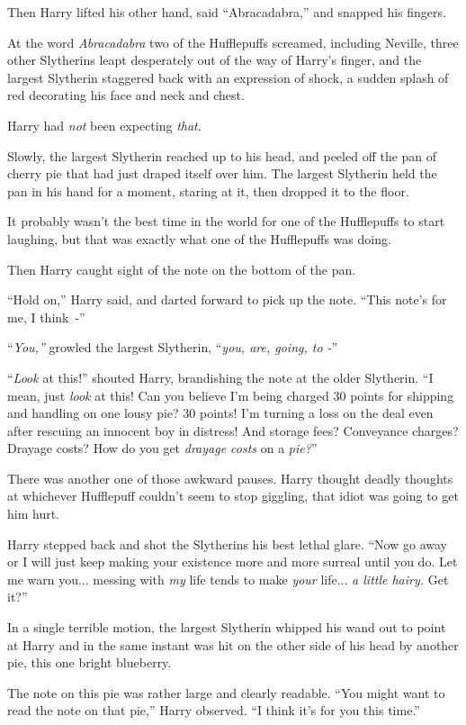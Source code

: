 Then Harry lifted his other hand, said ``Abracadabra,'' and snapped his fingers.

At the word \emph{Abracadabra} two of the Hufflepuffs screamed, including Neville, three other Slytherins leapt desperately out of the way of Harry's finger, and the largest Slytherin staggered back with an expression of shock, a sudden splash of red decorating his face and neck and chest.

Harry had \emph{not} been expecting \emph{that}.

Slowly, the largest Slytherin reached up to his head, and peeled off the pan of cherry pie that had just draped itself over him. The largest Slytherin held the pan in his hand for a moment, staring at it, then dropped it to the floor.

It probably wasn't the best time in the world for one of the Hufflepuffs to start laughing, but that was exactly what one of the Hufflepuffs was doing.

Then Harry caught sight of the note on the bottom of the pan.

``Hold on,'' Harry said, and darted forward to pick up the note. ``This note's for me, I think~-''

``\emph{You,''} growled the largest Slytherin, ``\emph{you, are, going, to -}''

``\emph{Look} at this!'' shouted Harry, brandishing the note at the older Slytherin. ``I mean, just \emph{look} at this! Can you believe I'm being charged 30 points for shipping and handling on one lousy pie? 30 points! I'm turning a loss on the deal even after rescuing an innocent boy in distress! And storage fees? Conveyance charges? Drayage costs? How do you get \emph{drayage costs} on a \emph{pie?}''

There was another one of those awkward pauses. Harry thought deadly thoughts at whichever Hufflepuff couldn't seem to stop giggling, that idiot was going to get him hurt.

Harry stepped back and shot the Slytherins his best lethal glare. ``Now go away or I will just keep making your existence more and more surreal until you do. Let me warn you... messing with \emph{my} life tends to make \emph{your} life... \emph{a little hairy.} Get it?''

In a single terrible motion, the largest Slytherin whipped his wand out to point at Harry and in the same instant was hit on the other side of his head by another pie, this one bright blueberry.

The note on this pie was rather large and clearly readable. ``You might want to read the note on that pie,'' Harry observed. ``I think it's for you this time.''

